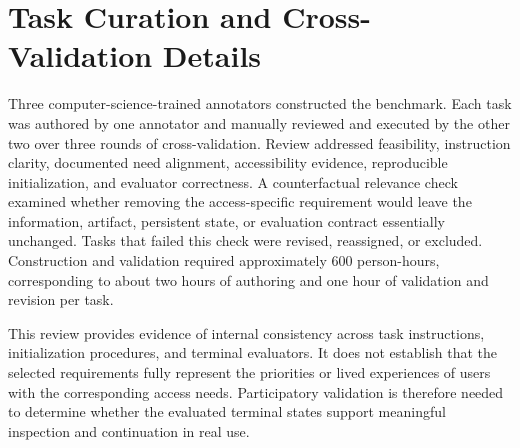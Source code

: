 \documentclass[11pt]{article}
\begin{document}
\section{Task Curation and Cross-Validation Details}

Three computer-science-trained annotators constructed the benchmark. Each task was authored by one annotator and manually reviewed and executed by the other two over three rounds of cross-validation. Review addressed feasibility, instruction clarity, documented need alignment, accessibility evidence, reproducible initialization, and evaluator correctness. A counterfactual relevance check examined whether removing the access-specific requirement would leave the information, artifact, persistent state, or evaluation contract essentially unchanged. Tasks that failed this check were revised, reassigned, or excluded. Construction and validation required approximately 600 person-hours, corresponding to about two hours of authoring and one hour of validation and revision per task.

\newpage
This review provides evidence of internal consistency across task instructions, initialization procedures, and terminal evaluators. It does not establish that the selected requirements fully represent the priorities or lived experiences of users with the corresponding access needs. Participatory validation is therefore needed to determine whether the evaluated terminal states support meaningful inspection and continuation in real use.
\end{document}
